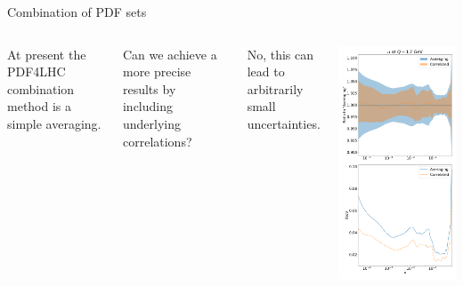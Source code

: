 \begin{frame}{Combination of PDF sets}
    	\begin{columns}[t]

			At present the PDF4LHC combination method is a simple averaging. 

        	\vspace{0.2cm}

			Can we achieve a more precise results by including underlying correlations?

        	\vspace{0.2cm}

			No, this can lead to arbitrarily small uncertainties.

       	\vspace{-1.5cm}
       	\begin{center}
       		\includegraphics[height=1\textheight]{roy_pdf_correlations/ratio_2.pdf}

\end{center}
\end{columns}
\end{frame}
